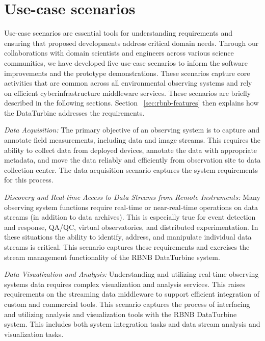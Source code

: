 \section{Use-case scenarios}\label{sec:use-case-scenarios}

Use-case scenarios are essential tools for understanding requirements and ensuring that proposed developments address critical domain needs.  Through our collaborations with domain scientists and engineers across various science communities, we have developed five use-case scenarios to inform the software improvements and the prototype demonstrations.  These scenarios capture core activities that are common across all environmental observing systems and rely on efficient cyberinfrastructure middleware services.  These scenarios are briefly described in the following sections. Section ~\ref{sec:rbnb-features} then explains how the DataTurbine addresses the requirements.

\emph{Data Acquisition:} The primary objective of an observing system is to capture and annotate field measurements, including data and image streams.  This requires the ability to collect data from deployed devices, annotate the data with appropriate metadata, and move the data reliably and efficiently from observation site to data collection center.  The data acquisition scenario captures the system requirements for this process. 

\emph{Discovery and Real-time Access to Data Streams from Remote Instruments:} Many observing system functions require real-time or near-real-time operations on data streams (in addition to data archives).  This is especially true for event detection and response, QA/QC, virtual observatories, and distributed experimentation.  In these situations the ability to identify, address, and manipulate individual data streams is critical.  This scenario captures these requirements and exercises the stream management functionality of the RBNB DataTurbine system. 

\emph{Data Visualization and Analysis:} Understanding and utilizing real-time observing systems data requires complex visualization and analysis services.  This raises requirements on the streaming data middleware to support efficient integration of custom and commercial tools.  This scenario captures the process of interfacing and utilizing analysis and visualization tools with the RBNB DataTurbine system.  This includes both system integration tasks and data stream analysis and visualization tasks.

